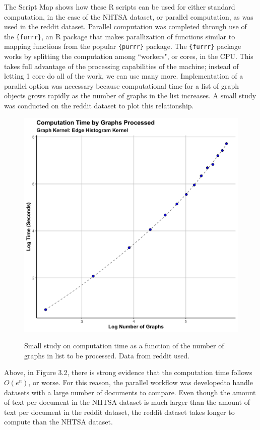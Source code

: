  The Script Map shows how these R scripts can be used for either standard computation, in the case of the NHTSA dataset, or parallel computation, as was used in the reddit dataset. Parallel computation was completed through use of the \texttt{\{furrr\}}, an R package that makes parallization of functions similar to mapping functions from the popular \texttt{\{purrr\}} package. The \texttt{\{furrr\}} package works by splitting the computation among ``workers", or cores, in the CPU. This takes full advantage of the processing capabilities of the machine; instead of letting 1 core do all of the work, we can use many more. Implementation of a parallel option was necessary because computational time for a list of graph objects grows rapidly as the number of graphs in the list increases. A small study was conducted on the reddit dataset to plot this relationship.\\
 
\begin{figure}
\includegraphics[width=6in]{Content/Images/edgeHistTimePlot.png}\\
\caption{Small study on computation time as a function of the number of graphs in list to be processed. Data from reddit used.}
\end{figure}
 
Above, in Figure 3.2, there is strong evidence that the computation time follows $O(e^n)$, or worse. For this reason, the parallel workflow was developed\textemdash to handle datasets with a large number of documents to compare. Even though the amount of text per document in the NHTSA dataset is much larger than the amount of text per document in the reddit dataset, the reddit dataset takes longer to compute than the NHTSA dataset. \\


